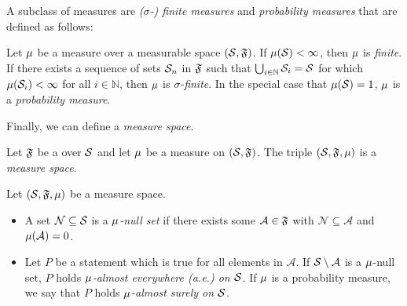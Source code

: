 A subclass of measures are \emph{(\(\sigma\)-) finite measures} and \emph{probability measures} that are defined as follows:
\begin{definition}%
	\label{def:finite measures and probablility measures}
	Let \( \mu \) be a measure over a measurable space \( (\mathcal{S}, \mathfrak{F}) \).
	If \( \mu(\mathcal{S}) < \infty \), then \( \mu \) is \emph{finite}.
	If there exists a sequence of sets \( \mathcal{S}_n \) in \( \mathfrak{F} \) such that \( \bigcup_{i \in \mathbb{N}} \mathcal{S}_i = \mathcal{S} \) for which \( \mu(\mathcal{S}_i) < \infty \) for all \( i \in \mathbb{N} \), then \( \mu \) is \emph{\( \sigma \)-finite}.
	In the special case that \( \mu(\mathcal{S}) = \num{1} \), \( \mu \) is a \emph{probability measure}.
\end{definition}
Finally, we can define a \emph{measure space}.
\begin{definition}%
	\label{def:measure space}
	Let \( \mathfrak{F} \) be a \SigmaAlgebra{} over \( \mathcal{S} \) and let \( \mu \) be a measure on \( (\mathcal{S}, \mathfrak{F}) \).
	The triple \( (\mathcal{S}, \mathfrak{F}, \mu) \) is a \emph{measure space}.
\end{definition}
\begin{definition}%
	\label{def:almost everywhere}
	Let \( (\mathcal{S}, \mathfrak{F}, \mu) \) be a measure space.
	\begin{itemize}
		\item A set \( \mathcal{N} \subseteq \mathcal{S} \) is a \emph{\( \mu \)-null set} if there exists some \( \mathcal{A} \in \mathfrak{F} \) with \( \mathcal{N} \subseteq \mathcal{A} \) and \( \mu(\mathcal{A}) = \num{0} \).
		\item Let \( P \) be a statement which is true for all elements in \( \mathcal{A} \).
			If \( \mathcal{S} \setminus \mathcal{A} \) is a \( \mu \)-null set, \( P \) holds \emph{\(\mu\)-almost everywhere (a.e.) on \( \mathcal{S} \)}.
			If \( \mu \) is a probability measure, we say that \( P \) holds \emph{\( \mu \)-almost surely on \( \mathcal{S} \)}.
	\end{itemize}
\end{definition}
